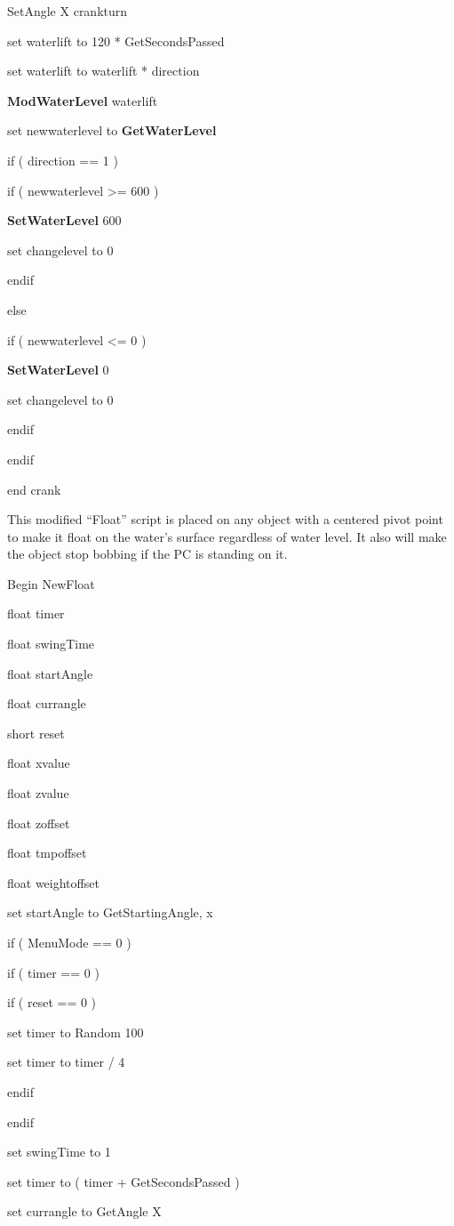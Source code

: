 \documentclass[
]{article}
\begin{document}
SetAngle X crankturn

set waterlift to 120 * GetSecondsPassed

set waterlift to waterlift * direction

\textbf{ModWaterLevel} waterlift

set newwaterlevel to \textbf{GetWaterLevel}

if ( direction == 1 )

if ( newwaterlevel \textgreater= 600 )

\textbf{SetWaterLevel} 600

set changelevel to 0

endif

else

if ( newwaterlevel \textless= 0 )

\textbf{SetWaterLevel} 0

set changelevel to 0

endif

endif

end crank

This modified ``Float'' script is placed on any object with a centered
pivot point to make it float on the water's surface regardless of water
level. It also will make the object stop bobbing if the PC is standing
on it.

Begin NewFloat

float timer

float swingTime

float startAngle

float currangle

short reset

float xvalue

float zvalue

float zoffset

float tmpoffset

float weightoffset

set startAngle to GetStartingAngle, x

if ( MenuMode == 0 )

if ( timer == 0 )

if ( reset == 0 )

set timer to Random 100

set timer to timer / 4

endif

endif

set swingTime to 1

set timer to ( timer + GetSecondsPassed )

set currangle to GetAngle X
\end{document}
